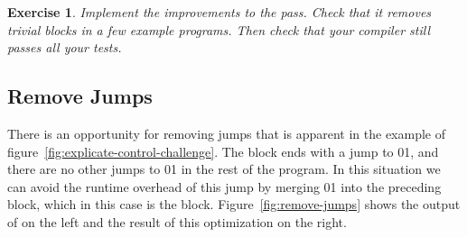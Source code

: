 \documentclass[7x10]{TimesAPriori_MIT}%
\def\racketEd{0}
\def\pythonEd{1}
\providecommand{\BookEdition}{1}
\let\edition\BookEdition
\newcommand{\racket}[1]{{\if\edition\racketEd{#1}\fi}}
\newcommand{\pythonColor}[0]{}
\newcommand{\python}[1]{{\if\edition\pythonEd\pythonColor #1\fi}}
\newtheorem{exercise}[theorem]{Exercise}
\numberwithin{theorem}{chapter}
\numberwithin{definition}{chapter}
\numberwithin{equation}{chapter}
\begin{document}



\begin{exercise}\normalfont\normalsize
  Implement the improvements to the  pass.
  Check that it removes trivial blocks in a few example programs. Then
  check that your compiler still passes all your tests.
\end{exercise}


\subsection{Remove Jumps}

There is an opportunity for removing jumps that is apparent in the
example of figure~\ref{fig:explicate-control-challenge}. The
 block ends with a jump to
\racket{}\python{}, and there are no
other jumps to \racket{}\python{} in
the rest of the program.  In this situation we can avoid the runtime
overhead of this jump by merging
\racket{}\python{} into the preceding
block, which in this case is the  block.
Figure~\ref{fig:remove-jumps} shows the output of
 on the left and the result of this
optimization on the right.
\end{document}
